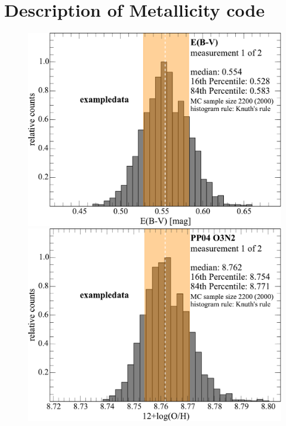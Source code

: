 \documentclass{emulateapj}
\begin{document}


\section{Description of Metallicity code}\label{method_sec}


\begin{figure}[!ht]
\centerline{
\includegraphics[width=0.98\columnwidth]{exampledata_n2000_EB-V_1.pdf}
\includegraphics[width=0.98\columnwidth]{exampledata_n2000_PP04_O3N2_1.pdf}}

\end{figure}
\end{document}
